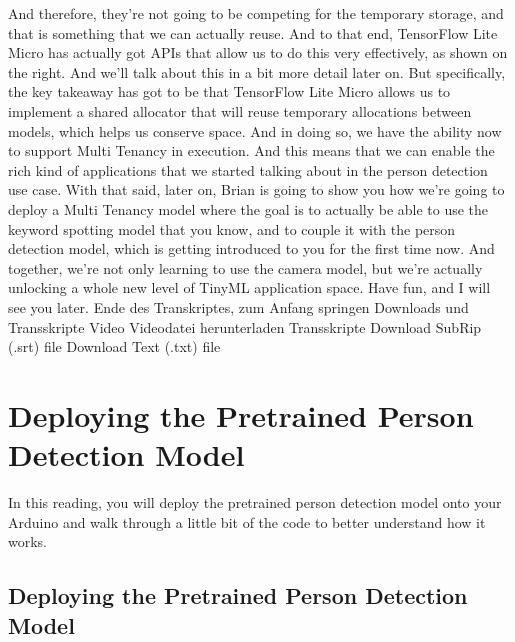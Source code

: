      And therefore, they're not going to be competing for the temporary storage,
     and that is something that we can actually reuse.
     And to that end, TensorFlow Lite Micro has actually
     got APIs that allow us to do this very effectively, as shown on the right.
     And we'll talk about this in a bit more detail later on.
     But specifically, the key takeaway has got
     to be that TensorFlow Lite Micro allows us to implement a shared allocator that
     will reuse temporary allocations between models, which helps us conserve space.
     And in doing so, we have the ability now to support Multi Tenancy in execution.
     And this means that we can enable the rich kind of applications
     that we started talking about in the person detection use case.
     With that said, later on, Brian is going to show you
     how we're going to deploy a Multi Tenancy model where the goal is
     to actually be able to use the keyword spotting model that you know,
     and to couple it with the person detection model, which
     is getting introduced to you for the first time now.
     And together, we're not only learning to use the camera model,
     but we're actually unlocking a whole new level of TinyML application space.
     Have fun, and I will see you later.
     Ende des Transkriptes, zum Anfang springen
     Downloads und Transskripte
     Video
     Videodatei herunterladen
     Transskripte
     Download SubRip (.srt) file
     Download Text (.txt) file   
    
\section{Deploying the Pretrained Person Detection Model}

    In this reading, you will deploy the pretrained person detection model onto your Arduino and walk through a little bit of the code to better understand how it works.
    
\subsection{Deploying the Pretrained Person Detection Model}

